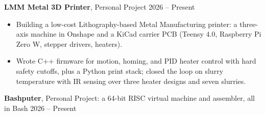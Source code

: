 \textbf{LMM Metal 3D Printer}, Personal Project \hfill 2026 -- Present
\begin{itemize}[noitemsep, topsep=0pt, partopsep=0pt, parsep=0pt]
    \item Building a low-cost Lithography-based Metal Manufacturing printer: a three-axis machine in Onshape and a KiCad carrier PCB (Teensy 4.0, Raspberry Pi Zero W, stepper drivers, heaters).

    \item Wrote C++ firmware for motion, homing, and PID heater control with hard safety cutoffs, plus a Python print stack; closed the loop on slurry temperature with IR sensing over three heater designs and seven slurries.
\end{itemize}

\vspace{4pt}

\textbf{Bashputer}, Personal Project: a 64-bit RISC virtual machine and assembler, all in Bash \hfill 2026 -- Present
